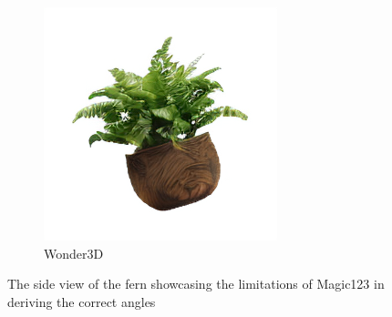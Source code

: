 \begin{figure}[ht]
\begin{subfigure}[b]{0.32\textwidth}
        \includegraphics[width=\textwidth]{etc/a high-quality rendering of a fern in a wooden pot/wonder3D/rgb_000_right.png}
        \caption{Wonder3D}
    \end{subfigure}
    \caption{The side view of the fern showcasing the limitations of Magic123 in deriving the correct angles}\label{fig:fernSideview}
  \end{figure}



